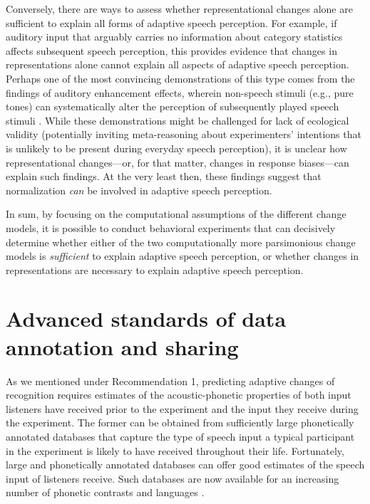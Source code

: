 \documentclass[
  11pt,
  man,floatsintext]{apa6}
\begin{document}
Conversely, there are ways to assess whether representational changes alone are sufficient to explain all forms of adaptive speech perception. For example, if auditory input that arguably carries no information about category statistics affects subsequent speech perception, this provides evidence that changes in representations alone cannot explain all aspects of adaptive speech perception. Perhaps one of the most convincing demonstrations of this type comes from the findings of auditory enhancement effects, wherein non-speech stimuli (e.g., pure tones) can systematically alter the perception of subsequently played speech stimuli \autocites{chodroff-wilson2020,holt2001,holt2005,holt2006,huang-holt2011}[for review, see also][]{weatherholtz-jaeger2016}. While these demonstrations might be challenged for lack of ecological validity (potentially inviting meta-reasoning about experimenters' intentions that is unlikely to be present during everyday speech perception), it is unclear how representational changes---or, for that matter, changes in response biases---can explain such findings. At the very least then, these findings suggest that normalization \emph{can} be involved in adaptive speech perception.

In sum, by focusing on the computational assumptions of the different change models, it is possible to conduct behavioral experiments that can decisively determine whether either of the two computationally more parsimonious change models is \emph{sufficient} to explain adaptive speech perception, or whether changes in representations are necessary to explain adaptive speech perception.

\hypertarget{sec:DataSharing}{%
\section{Advanced standards of data annotation and sharing}\label{sec:DataSharing}}

As we mentioned under Recommendation 1, predicting adaptive changes of recognition requires estimates of the acoustic-phonetic properties of both input listeners have received prior to the experiment and the input they receive during the experiment. The former can be obtained from sufficiently large phonetically annotated databases that capture the type of speech input a typical participant in the experiment is likely to have received throughout their life. Fortunately, large and phonetically annotated databases can offer good estimates of the speech input of listeners receive. Such databases are now available for an increasing number of phonetic contrasts and languages \autocites[e.g.,][]{chodroff-wilson2018,clopper-pisoni2006,hillenbrand1995,newman2001,theodore2009}[among many others]{xie-jaeger2020}.
\end{document}
